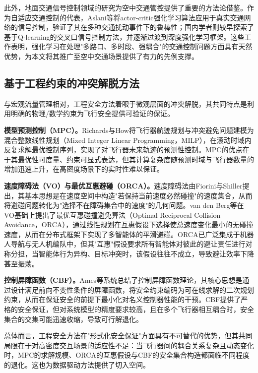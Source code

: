 \documentclass[12pt,a4paper,UTF8]{ctexbook}
\begin{document}
此外，地面交通信号控制领域的研究为空中交通管控提供了重要的方法论借鉴。作为自适应交通控制的代表，Aslani等\cite{ref12}将actor-critic强化学习算法应用于真实交通网络的信号控制，验证了其在多种交通扰动事件下的鲁棒性；国内学者则较早探索了基于Q-learning的交叉口信号控制方法\cite{ref16,ref19,ref20}，并逐渐过渡到深度强化学习框架\cite{ref15,ref17,ref18,ref22}。这些工作表明，强化学习在处理"多路口、多时段、强耦合"的交通控制问题方面具有天然优势，为本文将其推广至空中交通场景提供了有力的先例支撑。

\subsection{基于工程约束的冲突解脱方法}

与宏观流量管理相对，工程安全方法着眼于微观层面的冲突解脱，其共同特点是利用明确的物理/数学约束为飞行安全提供可验证的保证。

\textbf{模型预测控制（MPC）。}Richards与How\cite{ref3}将飞行器航迹规划与冲突避免问题建模为混合整数线性规划（Mixed Integer Linear Programming，MILP），在滚动时域内反复求解最优控制序列，实现了对飞行器未来轨迹的预测性控制。MPC的优点在于其最优性可度量、约束可显式表达，但其计算复杂度随预测时域与飞行器数量的增加迅速上升，在高密度场景下的实时性难以保证。

\textbf{速度障碍法（VO）与最优互惠避碰（ORCA）。}速度障碍法由Fiorini与Shiller提出，其基本思想是在速度空间中构造"若保持当前速度必然碰撞"的速度集合，从而将避碰问题转化为"选择不在障碍集合中的速度"的几何问题。van den Berg等\cite{ref4}在VO基础上提出了最优互惠碰撞避免算法（Optimal Reciprocal Collision Avoidance，ORCA），通过线性规划在互惠假设下选择使总速度变化最小的无碰撞速度，从而在分布式框架下实现了多智能体的平滑避碰。ORCA已广泛集成于机器人导航与无人机编队中，但其"互惠"假设要求所有智能体对彼此的避让责任进行对称分担，当智能体行为异构、目标冲突时，该假设往往不成立，导致避让效率下降甚至振荡。

\textbf{控制屏障函数（CBF）。}Ames等\cite{ref5}系统总结了控制屏障函数理论，其核心思想是通过设计满足前向不变性条件的屏障函数，将安全约束编码为可在线求解的二次规划约束，从而在保证安全的前提下最小化对名义控制器性能的干预。CBF提供了严格的安全保证，但对系统模型的精度要求较高，且在多个飞行器相互耦合时，安全集合的交集可能迅速收缩，导致可行解退化。

总体而言，工程安全方法在"形式化安全保证"方面具有不可替代的优势，但其共同局限在于对高密度交互场景的适应性不足：当飞行器间的耦合关系复杂且动态变化时，MPC的求解规模、ORCA的互惠假设与CBF的安全集合构造都面临不同程度的退化。这也为数据驱动方法提供了切入空间。
\end{document}

